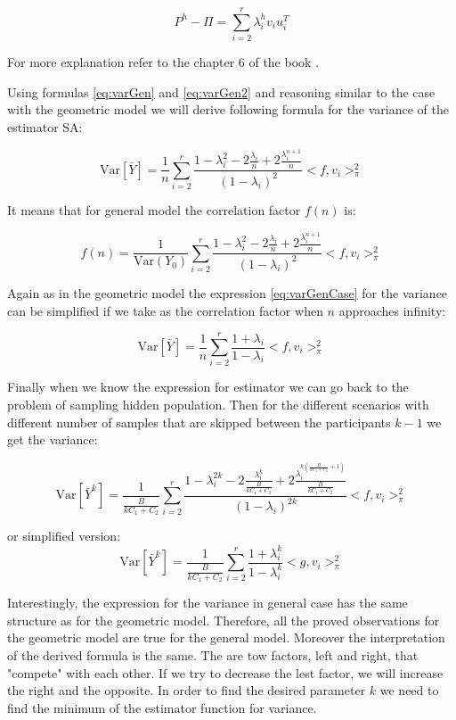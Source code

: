 \documentclass[12pt]{report}
\begin{document}
\begin{equation}\label{eq:varGen2}
P^h - \Pi = \sum_{i = 2}^r \lambda_i^h v_i u_i^T
\end{equation}

For more explanation refer to the chapter 6 of the book \cite{bremaud2013markov}.


Using formulas \ref{eq:varGen} and \ref{eq:varGen2} and reasoning similar to the case with the geometric model we will derive following formula for the variance of the estimator SA:

\begin{equation}
\label{eq:varGenCase}
 \mathrm{Var}\left[\bar{Y} \right] = \frac{1}{n} \sum_{i=2}^r\frac{1-\lambda_i^2 - 2\frac{\lambda_i}{n} + 2\frac{\lambda_i^{n+1}}{n}}{(1 - \lambda_i)^2} <f, v_i>^2_{\pi}
\end{equation}

It means that for general model the correlation factor $f(n)$ is:

$$ f(n) = \frac{1}{\mathrm{Var}(Y_0)} \sum_{i=2}^r\frac{1-\lambda_i^2 - 2\frac{\lambda_i}{n} + 2\frac{\lambda_i^{n+1}}{n}}{(1 - \lambda_i)^2} <f, v_i>^2_{\pi}$$

Again as in the geometric model the expression \ref{eq:varGenCase} for the variance can be simplified if we take as the correlation factor when $n$ approaches infinity:

$$ \mathrm{Var}\left[\bar{Y} \right] = \frac{1}{n} \sum_{i=2}^r\frac{1 + \lambda_i}{1 - \lambda_i} <f, v_i>^2_{\pi}$$

Finally when we know the expression for estimator we can go back to the problem of sampling hidden population. Then for the different scenarios with different number of samples that are skipped between the participants $k - 1$ we get the variance: 


\begin{equation}
\label{eq:genVarSkip}
\mathrm{Var}\left[\bar{Y}^k \right] =  \frac{1}{\frac{B}{kC_1 + C_2}} \sum_{i=2}^r\frac{1-\lambda_i^{2k} - 2\frac{\lambda_i^k}{\frac{B}{kC_1 + C_2}} + 2\frac{\lambda_i^{k\left(\frac{B}{kC_1 + C_2}+1\right)}}{\frac{B}{kC_1 + C_2}}}{(1 - \lambda_i)^{2k}} <f, v_i>^2_{\pi}
\end{equation}


or simplified version:
$$ \mathrm{Var}\left[\bar{Y}^k \right] = \frac{1}{\frac{B}{kC_1 + C_2}} \sum_{i=2}^r\frac{1 + \lambda_i^k}{1 - \lambda_i^k} <g, v_i>^2_{\pi}$$

Interestingly, the expression for the variance in general case has the same structure as for the geometric model. Therefore, all the proved observations for the geometric model are true for the general model. Moreover the interpretation of the derived formula is the same. The are tow factors, left and right, that "compete" with each other. If we try to decrease the lest factor, we will increase the right and the opposite. In order to find the desired parameter $k$ we need to find the minimum of the estimator function for variance. 
\end{document}
